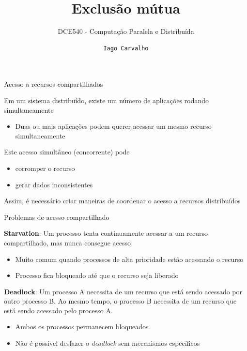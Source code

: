 \documentclass[compress]{beamer}
\title{Exclusão mútua}
\subtitle{DCE540 - Computação Paralela e Distribuída}
\author{\texttt{Iago Carvalho}}
\institute{\texttt{Departamento de Ciência da Computação}}
\begin{document}
\begin{frame}
\titlepage

\end{frame}


\begin{frame}{Acesso a recursos compartilhados}

Em um sistema distribuído, existe um número de aplicações rodando simultaneamente
\begin{itemize}
    \item Duas ou mais aplicações podem querer acessar um mesmo recurso simultaneamente
\end{itemize}

\vspace{0.5cm}

Este acesso simultâneo (concorrente) pode
\begin{itemize}
    \item corromper o recurso
    \item gerar dados inconsistentes
\end{itemize}

\vspace{0.5cm}

Assim, é necessário criar maneiras de coordenar o acesso a recursos distribuídos

\end{frame}


\begin{frame}{Problemas de acesso compartilhado}

\textbf{Starvation}: Um processo tenta continuamente acessar a um recurso compartilhado, mas nunca consegue acesso
\begin{itemize}
    \item Muito comum quando processos de alta prioridade estão acessando o recurso
    \item Processo fica bloqueado até que o recurso seja liberado
\end{itemize}

\vspace{0.5cm}

\textbf{Deadlock}: Um processo A necessita de um recurso que está sendo acessado por outro processo B. Ao mesmo tempo, o processo B necessita de um recurso que está sendo acessado pelo processo A.
\begin{itemize}
    \item Ambos os processos permanecem bloqueados
    \item Não é possível desfazer o \textit{deadlock} sem mecanismos específicos
\end{itemize}
\end{frame}
\end{document}
